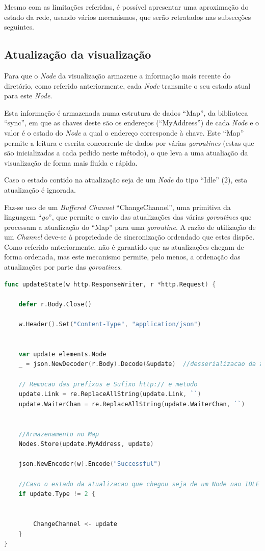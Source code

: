Mesmo com as limitações referidas, é possível apresentar uma aproximação do estado da rede, usando vários mecanismos, que serão retratados nas subsecções seguintes.

\subsection*{Atualização da visualização}
Para que o \emph{Node} da visualização armazene a informação mais recente do diretório, como referido anteriormente,
cada \emph{Node} transmite o seu estado atual para este \emph{Node}.

Esta informação é armazenada numa estrutura de dados ``Map'', da biblioteca ``sync'', em que as chaves deste são os endereços (``MyAddress'') de cada 
\emph{Node} e o valor é o estado do \emph{Node} a qual o endereço corresponde à chave. Este ``Map'' permite a leitura e escrita concorrente de dados por várias \emph{goroutines} (estas que são inicializadas a cada pedido neste método), o que leva a uma atualiação da visualização de forma mais fluída e rápida.

Caso o estado contido na atualização seja de um \emph{Node} do tipo ``Idle'' (2), esta atualização é ignorada.

Faz-se uso de um \emph{Buffered Channel} ``ChangeChannel'', uma primitiva da linguagem ``\emph{go}'', que permite o envio das atualizações das várias \emph{goroutines} que processam a atualização do ``Map'' para uma \emph{goroutine}.
A razão de utilização de um \emph{Channel} deve-se à propriedade de sincronização ordendado que estes dispõe. Como referido anteriormente, não é garantido que as atualizações chegam de forma ordenada, mas este mecanismo permite, pelo menos, a ordenação das atualizações por parte das \emph{goroutines}.

\begin{lstlisting}[caption={\emph{Handler} ``updateState'' do método ``/updateState''},language=Go]
	func updateState(w http.ResponseWriter, r *http.Request) {

	defer r.Body.Close()

	w.Header().Set("Content-Type", "application/json")


	var update elements.Node
	_ = json.NewDecoder(r.Body).Decode(&update)  //desserializacao da atualizacao numa struct do tipo Node

	// Remocao das prefixos e Sufixo http:// e metodo
	update.Link = re.ReplaceAllString(update.Link, ``)
	update.WaiterChan = re.ReplaceAllString(update.WaiterChan, ``)

	
	//Armazenamento no Map
	Nodes.Store(update.MyAddress, update)

	json.NewEncoder(w).Encode("Successful")

	//Caso o estado da atualizacao que chegou seja de um Node nao IDLE (2)
	if update.Type != 2 {

		
		ChangeChannel <- update
	}
}

\end{lstlisting}


